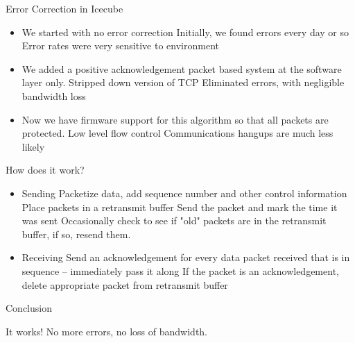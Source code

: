 \documentclass[pdf,serpaggi,slideColor,colorBG]{prosper}
\begin{document}
\begin{slide}{Error Correction in Icecube}
\begin{itemize}

\item We started with no error correction
\subitem Initially, we found errors every day or so
\subitem Error rates were very sensitive to environment

\item We added a positive acknowledgement packet based system at
the software layer only.
\subitem Stripped down version of TCP
\subitem Eliminated errors, with negligible bandwidth loss

\item Now we have firmware support for this algorithm so that
all packets are protected.
\subitem Low level flow control
\subitem Communications hangups are much less likely

\end{itemize}
\end{slide}


\begin{slide}{How does it work?}
\begin{itemize}

\item Sending
\subitem Packetize data, add sequence number and other control information
\subitem Place packets in a retransmit buffer
\subitem Send the packet and mark the time it was sent
\subitem Occasionally check to see if "old" packets are
in the retransmit buffer, if so, resend them.

\item Receiving
\subitem Send an acknowledgement for every data packet
received that is in sequence -- immediately pass it along
\subitem If the packet is an acknowledgement, delete appropriate packet from
retransmit buffer
\end{itemize}
\end{slide}

\begin{slide}{Conclusion}

It works!  No more errors, no loss of bandwidth.

\end{slide}
\end{document}
